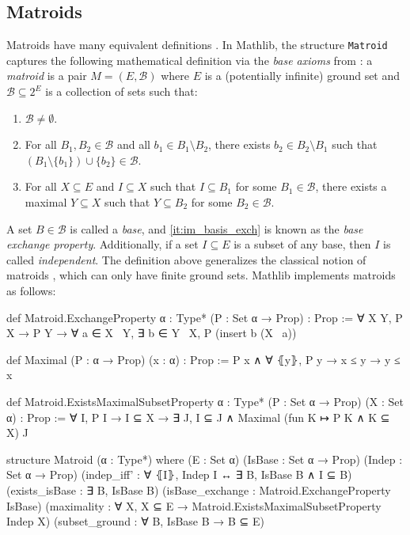 \subsection{Matroids}

Matroids have many equivalent definitions \cite{Oxley2011,Truemper2016,Bruhn2013}. In Mathlib, the structure \texttt{Matroid} captures the following mathematical definition via the \emph{base axioms} from \cite{Bruhn2013}: a \emph{matroid} is a pair $M = (E, \mathcal{B})$ where $E$ is a (potentially infinite) ground set and $\mathcal{B} \subseteq 2^{E}$ is a collection of sets such that:
\begin{enumerate}[label=(\roman*)]
    \item $\mathcal{B} \neq \emptyset$.
    \item\label{it:im_basis_exch} For all $B_{1}, B_{2} \in \mathcal{B}$ and all $b_{1} \in B_{1} \setminus B_{2}$, there exists $b_{2} \in B_{2} \setminus B_{1}$ such that $(B_{1} \setminus \{b_{1}\}) \cup \{b_{2}\} \in \mathcal{B}$.
    \item For all $X \subseteq E$ and $I \subseteq X$ such that $I \subseteq B_{1}$ for some $B_{1} \in \mathcal{B}$, there exists a maximal $Y \subseteq X$ such that $Y \subseteq B_{2}$ for some $B_{2} \in \mathcal{B}$.
\end{enumerate}
A set $B \in \mathcal{B}$ is called a \emph{base}, and \ref{it:im_basis_exch} is known as the \emph{base exchange property}. Additionally, if a set $I \subseteq E$ is a subset of any base, then $I$ is called \emph{independent}. The definition above generalizes the classical notion of matroids \cite{Oxley2011,Truemper2016}, which can only have finite ground sets. Mathlib implements matroids as follows:
\begin{leancode}
def Matroid.ExchangeProperty {α : Type*} 
    (P : Set α → Prop) : Prop :=
  ∀ X Y, P X → P Y → ∀ a ∈ X \ Y,
    ∃ b ∈ Y \ X, P (insert b (X \ {a}))
\end{leancode}
\begin{leancode}
def Maximal (P : α → Prop) (x : α) : Prop :=
  P x ∧ ∀ ⦃y⦄, P y → x ≤ y → y ≤ x
\end{leancode}
\begin{leancode}
def Matroid.ExistsMaximalSubsetProperty 
    {α : Type*} (P : Set α → Prop) 
    (X : Set α) : Prop :=
  ∀ I, P I → I ⊆ X → ∃ J, I ⊆ J 
    ∧ Maximal (fun K ↦ P K ∧ K ⊆ X) J
\end{leancode}
\begin{leancode}
structure Matroid (α : Type*) where
  (E : Set α)
  (IsBase : Set α → Prop)
  (Indep : Set α → Prop)
  (indep_iff' : ∀ ⦃I⦄, Indep I ↔ ∃ B,
    IsBase B ∧ I ⊆ B)
  (exists_isBase : ∃ B, IsBase B)
  (isBase_exchange : 
    Matroid.ExchangeProperty IsBase)
  (maximality : ∀ X, X ⊆ E →
    Matroid.ExistsMaximalSubsetProperty 
      Indep X)
  (subset_ground : ∀ B, IsBase B → B ⊆ E)
\end{leancode}

